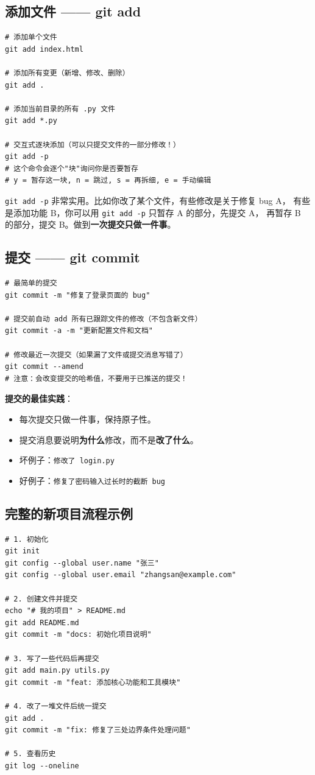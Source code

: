 \documentclass[12pt,a4paper]{article}
\begin{document}
\subsection{添加文件 —— git add}

\begin{lstlisting}
# 添加单个文件
git add index.html

# 添加所有变更（新增、修改、删除）
git add .

# 添加当前目录的所有 .py 文件
git add *.py

# 交互式逐块添加（可以只提交文件的一部分修改！）
git add -p
# 这个命令会逐个"块"询问你是否要暂存
# y = 暂存这一块, n = 跳过, s = 再拆细, e = 手动编辑
\end{lstlisting}

\texttt{git add -p} 非常实用。比如你改了某个文件，有些修改是关于修复 bug A，
有些是添加功能 B，你可以用 \texttt{git add -p} 只暂存 A 的部分，先提交 A，
再暂存 B 的部分，提交 B。做到\textbf{一次提交只做一件事}。

\subsection{提交 —— git commit}

\begin{lstlisting}
# 最简单的提交
git commit -m "修复了登录页面的 bug"

# 提交前自动 add 所有已跟踪文件的修改（不包含新文件）
git commit -a -m "更新配置文件和文档"

# 修改最近一次提交（如果漏了文件或提交消息写错了）
git commit --amend
# 注意：会改变提交的哈希值，不要用于已推送的提交！
\end{lstlisting}

\textbf{提交的最佳实践}：
\begin{itemize}[itemsep=3pt]
    \item 每次提交只做一件事，保持原子性。
    \item 提交消息要说明\textbf{为什么}修改，而不是\textbf{改了什么}。
    \item 坏例子：\texttt{修改了 login.py}
    \item 好例子：\texttt{修复了密码输入过长时的截断 bug}
\end{itemize}

\subsection{完整的新项目流程示例}

\begin{lstlisting}
# 1. 初始化
git init
git config --global user.name "张三"
git config --global user.email "zhangsan@example.com"

# 2. 创建文件并提交
echo "# 我的项目" > README.md
git add README.md
git commit -m "docs: 初始化项目说明"

# 3. 写了一些代码后再提交
git add main.py utils.py
git commit -m "feat: 添加核心功能和工具模块"

# 4. 改了一堆文件后统一提交
git add .
git commit -m "fix: 修复了三处边界条件处理问题"

# 5. 查看历史
git log --oneline
\end{lstlisting}
\end{document}
